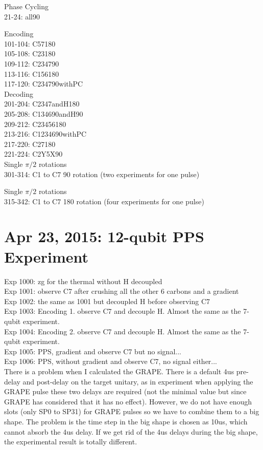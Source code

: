 \documentclass[prl,onecolumn]{revtex4-1}
\begin{document}
Phase Cycling \\
21-24: all90

Encoding \\
101-104: C57180 \\
105-108: C23180 \\
109-112: C234790 \\
113-116: C156180 \\
117-120: C234790withPC \\

Decoding \\
201-204: C2347andH180 \\
205-208: C134690andH90 \\
209-212: C23456180 \\
213-216: C1234690withPC \\
217-220: C27180 \\
221-224: C2Y5X90 \\

Single $\pi/2$ rotations \\
301-314: C1 to C7 90 rotation (two experiments for one pulse)

Single $\pi/2$ rotations \\
315-342: C1 to C7 180 rotation (four experiments for one pulse)

\newpage
\section{Apr 23, 2015: 12-qubit PPS Experiment}

Exp 1000: zg for the thermal without H decoupled \\
Exp 1001: observe C7 after crushing all the other 6 carbons and a gradient \\
Exp 1002: the same as 1001 but decoupled H before observing C7 \\
Exp 1003: Encoding 1. observe C7 and decouple H. Almost the same as the 7-qubit experiment. \\
Exp 1004: Encoding 2. observe C7 and decouple H. Almost the same as the 7-qubit experiment. \\
Exp 1005: PPS, gradient and observe C7 but no signal... \\
Exp 1006: PPS, without gradient and observe C7, no signal either... \\

There is a problem when I calculated the GRAPE. There is a default 4us pre-delay and post-delay on the target unitary, as in experiment when applying the GRAPE pulse these two delays are required (not the minimal value but since GRAPE has considered that it has no effect). However, we do not have enough slots (only SP0 to SP31) for GRAPE pulses so we have to combine them to a big shape. The problem is the time step in the big shape is chosen as 10us, which cannot absorb the 4us delay. If we get rid of the 4us delays during the big shape, the experimental result is totally different.
\end{document}
